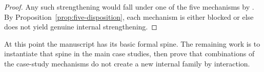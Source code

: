 \begin{proof}
Any such strengthening would fall under one of the five mechanisms by . By Proposition~\ref{prop:five-disposition}, each mechanism is either blocked or else does not yield genuine internal strengthening.
\end{proof}

\begin{remark}
At this point the manuscript has its basic formal spine. The remaining work is to instantiate that spine in the main case studies, then prove that combinations of the case-study mechanisms do not create a new internal family by interaction.
\end{remark}
